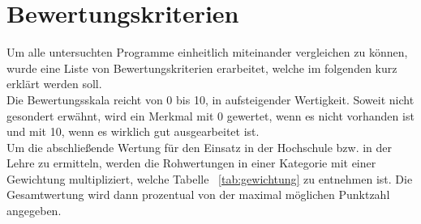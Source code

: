 \section{Bewertungskriterien}
Um alle untersuchten Programme einheitlich miteinander vergleichen zu können, wurde eine Liste von Bewertungskriterien erarbeitet, welche im folgenden kurz erklärt werden soll.\\
Die Bewertungsskala reicht von 0 bis 10, in aufsteigender Wertigkeit. Soweit nicht gesondert erwähnt, wird ein Merkmal mit 0 gewertet, wenn es nicht vorhanden ist und mit 10, wenn es wirklich gut ausgearbeitet ist.\\
Um die abschließende Wertung für den Einsatz in der Hochschule bzw. in der Lehre zu ermitteln, werden die Rohwertungen in einer Kategorie mit einer Gewichtung multipliziert, welche Tabelle ~\ref{tab:gewichtung} zu entnehmen ist. Die Gesamtwertung wird dann prozentual von der maximal möglichen Punktzahl angegeben.
